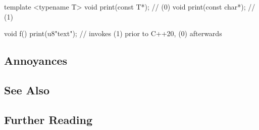\begin{emcppslisting}
template <typename T> void print(const T*);  // (0)
void print(const char*);                     // (1)

void f()
{
    print(u8"text");  // invokes (1) prior to C++20, (0) afterwards
}
\end{emcppslisting}
        

\subsection[Annoyances]{Annoyances}\label{annoyances}

\hspace{\fill}

\subsection[See Also]{See Also}\label{see-also}

\hspace{\fill}

\subsection[Further Reading]{Further Reading}\label{further-reading}

\hspace{\fill}

